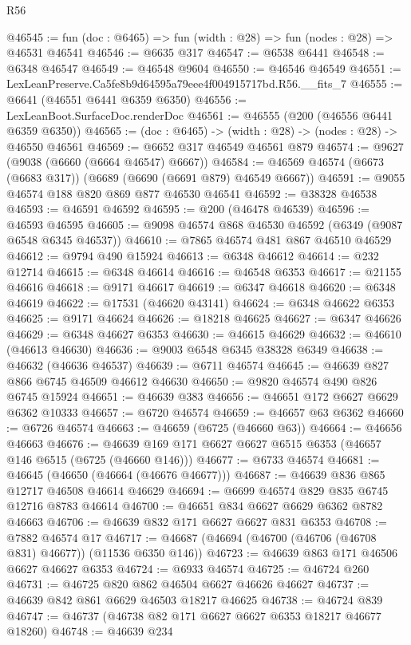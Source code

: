 \begin{lexlean}{R56}
\begin{coremodule}
@46545 := fun (doc : @6465) => fun (width : @28) => fun (nodes : @28) => @46531 @46541
@46546 := @6635 @317
@46547 := @6538 @6441
@46548 := @6348 @46547
@46549 := @46548 @9604
@46550 := @46546 @46549
@46551 := LexLeanPreserve.Ca5fe8b9d64595a79eee4f004915717bd.R56.__fits_7
@46555 := @6641 (@46551 @6441 @6359 @6350)
@46556 := LexLeanBoot.SurfaceDoc.renderDoc
@46561 := @46555 (@200 (@46556 @6441 @6359 @6350))
@46565 := (doc : @6465) -> (width : @28) -> (nodes : @28) -> @46550 @46561
@46569 := @6652 @317 @46549 @46561 @879
@46574 := @9627 (@9038 (@6660 (@6664 @46547) @6667))
@46584 := @46569 @46574 (@6673 (@6683 @317)) (@6689 (@6690 (@6691 @879) @46549 @6667))
@46591 := @9055 @46574 @188 @820 @869 @877 @46530 @46541
@46592 := @38328 @46538
@46593 := @46591 @46592
@46595 := @200 (@46478 @46539)
@46596 := @46593 @46595
@46605 := @9098 @46574 @868 @46530 @46592 (@6349 (@9087 @6548 @6345 @46537))
@46610 := @7865 @46574 @481 @867 @46510 @46529
@46612 := @9794 @490 @15924
@46613 := @6348 @46612
@46614 := @232 @12714
@46615 := @6348 @46614
@46616 := @46548 @6353
@46617 := @21155 @46616
@46618 := @9171 @46617
@46619 := @6347 @46618
@46620 := @6348 @46619
@46622 := @17531 (@46620 @43141)
@46624 := @6348 @46622 @6353
@46625 := @9171 @46624
@46626 := @18218 @46625
@46627 := @6347 @46626
@46629 := @6348 @46627 @6353
@46630 := @46615 @46629
@46632 := @46610 (@46613 @46630)
@46636 := @9003 @6548 @6345 @38328 @6349
@46638 := @46632 (@46636 @46537)
@46639 := @6711 @46574
@46645 := @46639 @827 @866 @6745 @46509 @46612 @46630
@46650 := @9820 @46574 @490 @826 @6745 @15924
@46651 := @46639 @383
@46656 := @46651 @172 @6627 @6629 @6362 @10333
@46657 := @6720 @46574
@46659 := @46657 @63 @6362
@46660 := @6726 @46574
@46663 := @46659 (@6725 (@46660 @63))
@46664 := @46656 @46663
@46676 := @46639 @169 @171 @6627 @6627 @6515 @6353 (@46657 @146 @6515 (@6725 (@46660 @146)))
@46677 := @6733 @46574
@46681 := @46645 (@46650 (@46664 (@46676 @46677)))
@46687 := @46639 @836 @865 @12717 @46508 @46614 @46629
@46694 := @6699 @46574 @829 @835 @6745 @12716 @8783 @46614
@46700 := @46651 @834 @6627 @6629 @6362 @8782 @46663
@46706 := @46639 @832 @171 @6627 @6627 @831 @6353
@46708 := @7882 @46574 @17
@46717 := @46687 (@46694 (@46700 (@46706 (@46708 @831) @46677)) (@11536 @6350 @146))
@46723 := @46639 @863 @171 @46506 @6627 @46627 @6353
@46724 := @6933 @46574
@46725 := @46724 @260
@46731 := @46725 @820 @862 @46504 @6627 @46626 @46627
@46737 := @46639 @842 @861 @6629 @46503 @18217 @46625
@46738 := @46724 @839
@46747 := @46737 (@46738 @82 @171 @6627 @6627 @6353 @18217 @46677 @18260)
@46748 := @46639 @234

\end{coremodule}
\end{lexlean}
